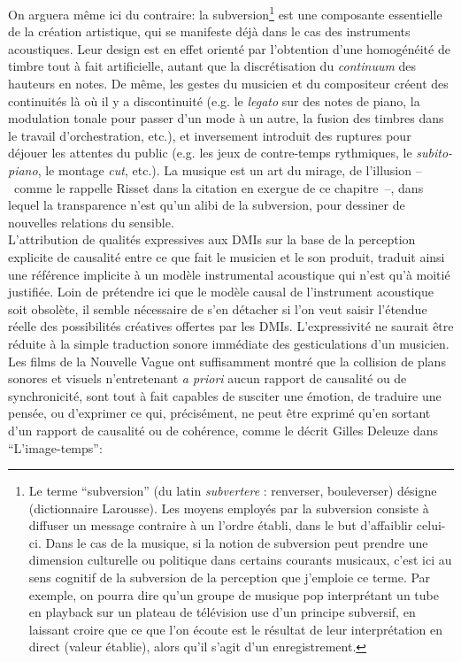 \indent On arguera même ici du contraire: la subversion\footnote{Le terme ``subversion'' (du latin \textit{subvertere} : renverser, bouleverser) désigne  (dictionnaire Larousse). Les moyens employés par la subversion consiste à diffuser un message contraire à un l'ordre établi, dans le but d'affaiblir celui-ci. Dans le cas de la musique, si la notion de subversion peut prendre une dimension culturelle ou politique dans certains courants musicaux, c'est ici au sens cognitif de la subversion de la perception que j'emploie ce terme. Par exemple, on pourra dire qu'un groupe de musique pop interprétant un tube en playback sur un plateau de télévision use d'un principe subversif, en laissant croire que ce que l'on écoute est le résultat de leur interprétation en direct (valeur établie), alors qu'il s'agit d'un enregistrement. } est une composante essentielle de la création artistique, qui se manifeste déjà dans le cas des instruments acoustiques. Leur design est en effet orienté par l'obtention d'une homogénéité de timbre tout à fait artificielle, autant que la discrétisation du \textit{continuum} des hauteurs en notes. De même, les gestes du musicien et du compositeur créent des continuités là où il y a discontinuité (e.g. le \textit{legato} sur des notes de piano, la modulation tonale pour passer d'un mode à un autre, la fusion des timbres dans le travail d'orchestration, etc.), et inversement introduit des ruptures pour déjouer les attentes du public (e.g. les jeux de contre-temps rythmiques, le \textit{subito-piano}, le montage \textit{cut}, etc.). La musique est un art du mirage, de l'illusion --~comme le rappelle Risset dans la citation en exergue de ce chapitre~--, dans lequel la transparence n'est qu'un alibi de la subversion, pour dessiner de nouvelles relations du sensible.\\
\indent L'attribution de qualités expressives aux \glspl{DMI} sur la base de la perception explicite de causalité entre ce que fait le musicien et le son produit, traduit ainsi une référence implicite à un modèle instrumental acoustique qui n'est qu'à moitié justifiée. Loin de prétendre ici que le modèle causal de l'instrument acoustique soit obsolète, il semble nécessaire de s'en détacher si l'on veut saisir l'étendue réelle des possibilités créatives offertes par les \glspl{DMI}. L'expressivité ne saurait être réduite à la simple traduction sonore immédiate des gesticulations d'un musicien. Les films de la Nouvelle Vague ont suffisamment montré que la collision de plans sonores et visuels n'entretenant \textit{a priori} aucun rapport de causalité ou de synchronicité, sont tout à fait capables de susciter une émotion, de traduire une pensée, ou d'exprimer ce qui, précisément, ne peut être exprimé qu'en sortant d'un rapport de causalité ou de cohérence, comme le décrit Gilles Deleuze dans ``L'image-temps'': 

